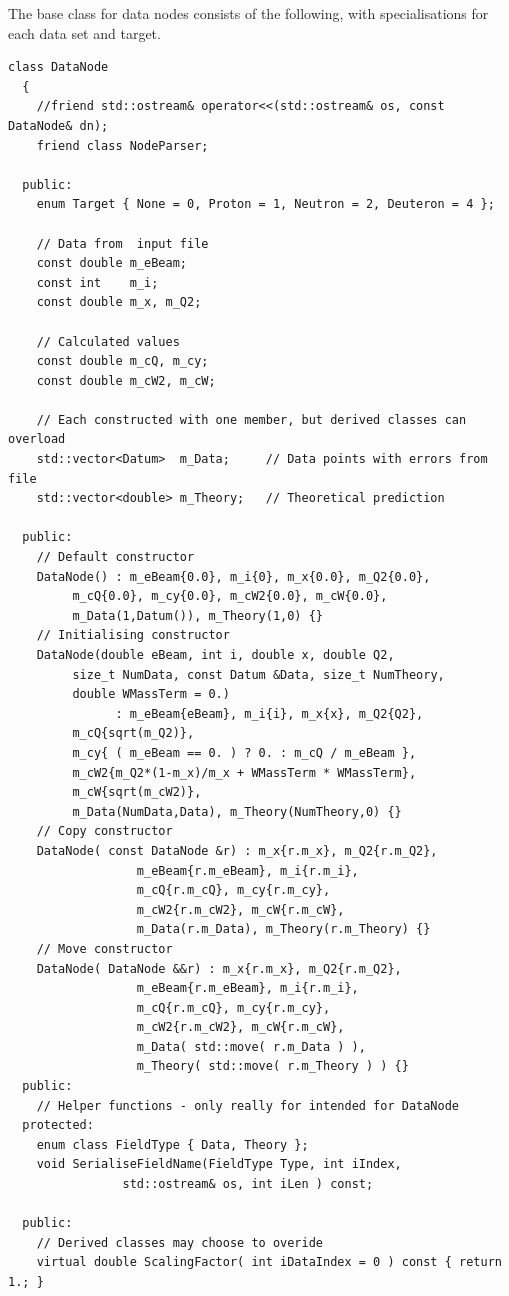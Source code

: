 \documentclass[12pt,a4paper]{report}
\begin{document}
The base class for data nodes consists of the following, with specialisations for each data set and target.

\begin{Verbatim}[fontsize=\small]
  class DataNode
  {
    //friend std::ostream& operator<<(std::ostream& os, const DataNode& dn);
    friend class NodeParser;

  public:
    enum Target { None = 0, Proton = 1, Neutron = 2, Deuteron = 4 };
 
    // Data from  input file
    const double m_eBeam;
    const int    m_i;
    const double m_x, m_Q2;

    // Calculated values
    const double m_cQ, m_cy;
    const double m_cW2, m_cW;

    // Each constructed with one member, but derived classes can overload
    std::vector<Datum>  m_Data;     // Data points with errors from file
    std::vector<double> m_Theory;   // Theoretical prediction

  public:
    // Default constructor
    DataNode() : m_eBeam{0.0}, m_i{0}, m_x{0.0}, m_Q2{0.0},
		 m_cQ{0.0}, m_cy{0.0}, m_cW2{0.0}, m_cW{0.0},
		 m_Data(1,Datum()), m_Theory(1,0) {}
    // Initialising constructor
    DataNode(double eBeam, int i, double x, double Q2,
	     size_t NumData, const Datum &Data, size_t NumTheory,
	     double WMassTerm = 0.)
               : m_eBeam{eBeam}, m_i{i}, m_x{x}, m_Q2{Q2},
		 m_cQ{sqrt(m_Q2)},
		 m_cy{ ( m_eBeam == 0. ) ? 0. : m_cQ / m_eBeam },
		 m_cW2{m_Q2*(1-m_x)/m_x + WMassTerm * WMassTerm},
		 m_cW{sqrt(m_cW2)},
		 m_Data(NumData,Data), m_Theory(NumTheory,0) {}
    // Copy constructor
    DataNode( const DataNode &r) : m_x{r.m_x}, m_Q2{r.m_Q2},
			      m_eBeam{r.m_eBeam}, m_i{r.m_i},
			      m_cQ{r.m_cQ}, m_cy{r.m_cy},
			      m_cW2{r.m_cW2}, m_cW{r.m_cW},
			      m_Data(r.m_Data), m_Theory(r.m_Theory) {}
    // Move constructor
    DataNode( DataNode &&r) : m_x{r.m_x}, m_Q2{r.m_Q2},
			      m_eBeam{r.m_eBeam}, m_i{r.m_i},
			      m_cQ{r.m_cQ}, m_cy{r.m_cy},
			      m_cW2{r.m_cW2}, m_cW{r.m_cW},
			      m_Data( std::move( r.m_Data ) ),
			      m_Theory( std::move( r.m_Theory ) ) {}
  public:
    // Helper functions - only really for intended for DataNode
  protected:
    enum class FieldType { Data, Theory };
    void SerialiseFieldName(FieldType Type, int iIndex,
			    std::ostream& os, int iLen ) const;

  public:
    // Derived classes may choose to overide
    virtual double ScalingFactor( int iDataIndex = 0 ) const { return 1.; }


\end{Verbatim}
\end{document}
